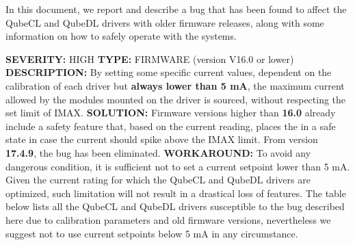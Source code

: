 In this document, we report and describe a bug that has been found to affect the QubeCL and QubeDL drivers with older firmware releases, along with some information on how to safely operate with the systems.
\newline


\textbf{SEVERITY:} HIGH
\newline \newline
\textbf{TYPE:} FIRMWARE (version V16.0 or lower)
\newline \newline
\textbf{DESCRIPTION:} By setting some specific current values, dependent on the calibration of each driver but \textbf{always lower than 5 mA}, the maximum current allowed by the modules mounted on the driver is sourced, without respecting the set limit of IMAX.
\newline \newline
\textbf{SOLUTION:} Firmware versions higher than \textbf{16.0} already include a safety feature that, based on the current reading, places the \QubeModel in a safe state in case the current should spike above the IMAX limit. \newline
From version \textbf{17.4.9}, the bug has been eliminated. 
\newline \newline
\textbf{WORKAROUND:}  To avoid any dangerous condition, it is sufficient not to set a current setpoint lower than 5 mA. Given the current rating for which the QubeCL and QubeDL drivers are optimized, such limitation will not result in a drastical loss of features. \newline
\iffalse
The table below lists all the QubeCL and QubeDL drivers susceptible to the bug described here due to calibration parameters and old firmware versions, nevertheless we suggest not to use current setpoints below 5 mA in any circumstance.
\newpage
